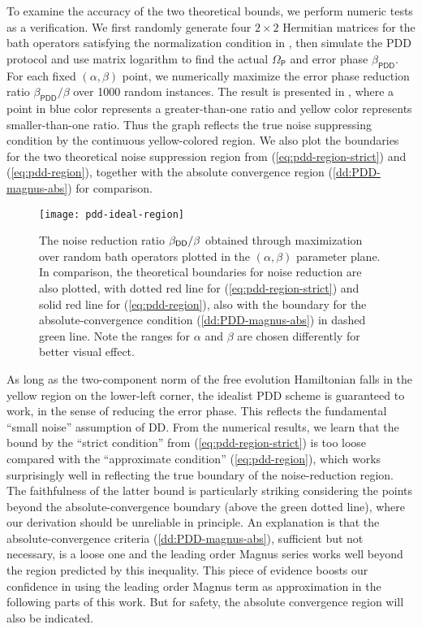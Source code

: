 \documentclass[aps,pra,reprint,superscriptaddress]{revtex4-2}
\newcommand{\Opdd}{\Omega_{\mathsf{P}}}
\begin{document}
To examine the accuracy of the two theoretical bounds, we perform numeric tests as a verification. We first randomly generate  four $2\times 2$ Hermitian matrices for the bath operators satisfying the normalization condition in , then simulate the PDD protocol and use matrix logarithm to find the actual $\Opdd$ and error phase $\beta_\mathsf{PDD}$.  For each fixed $(\alpha,\beta)$ point, we numerically maximize the error phase reduction ratio $\beta_\mathsf{PDD}/\beta$ over 1000 random instances. The result is presented in , where a point in blue color represents a greater-than-one ratio and  yellow color represents smaller-than-one ratio. Thus the graph reflects the true noise suppressing condition by the continuous yellow-colored region.
We also plot the boundaries for the two theoretical noise suppression region from (\ref{eq:pdd-region-strict}) and (\ref{eq:pdd-region}), together with the absolute convergence region (\ref{dd:PDD-magnus-abs}) for comparison. 

\begin{figure}[ht!]
\centering
\texttt{[image: pdd-ideal-region]}
\caption{The noise reduction ratio $\beta_{\mathsf{DD}}/\beta$ obtained through maximization over random bath operators plotted in the $(\alpha,\beta)$ parameter plane. In comparison, the theoretical boundaries for noise reduction are also plotted, with dotted red line for (\ref{eq:pdd-region-strict}) and solid red line for (\ref{eq:pdd-region}), also with the boundary for the absolute-convergence condition (\ref{dd:PDD-magnus-abs}) in dashed green line. Note the ranges for $\alpha$ and $\beta$ are chosen differently for better visual effect.}
\label{fig:pdd-region}
\end{figure}

As long as the two-component norm of the free evolution Hamiltonian falls in the yellow region on the lower-left corner, the idealist PDD scheme is guaranteed to work, in the sense of reducing the error phase. This reflects the fundamental ``small noise'' assumption of DD. From the numerical results, we learn that the bound by the ``strict condition'' from (\ref{eq:pdd-region-strict}) is too loose compared with the ``approximate condition'' (\ref{eq:pdd-region}), which works surprisingly well in reflecting the true boundary of the noise-reduction region. The faithfulness of the latter bound is particularly striking considering the points beyond the absolute-convergence boundary (above the green dotted line), where our derivation should be unreliable in principle. An explanation is that the absolute-convergence criteria (\ref{dd:PDD-magnus-abs}), sufficient but not necessary, is a loose one and the leading order Magnus series works well beyond the region predicted by this inequality. This piece of evidence boosts our confidence in using the leading order Magnus term as approximation in the following parts of this work. But for safety, the absolute convergence region will also be indicated. 
\end{document}
